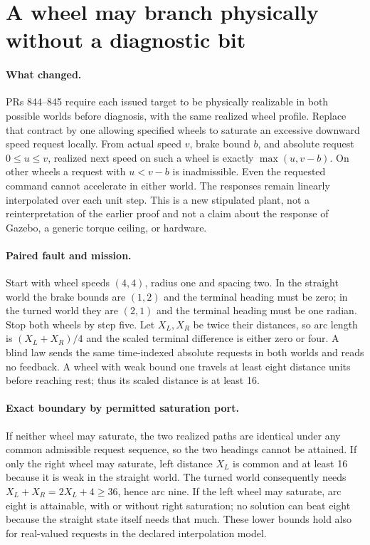 \documentclass{article}
\begin{document}
\section*{A wheel may branch physically without a diagnostic bit}
\paragraph{What changed.}
PRs 844--845 require each issued target to be physically realizable
in both possible worlds before diagnosis, with the same realized
wheel profile. Replace that contract by one allowing specified
wheels to saturate an excessive downward speed request locally.
From actual speed \(v\), brake bound \(b\), and absolute request
\(0\le u\le v\), realized next speed on such a wheel is exactly
\(\max(u,v-b)\). On other wheels a request with \(u<v-b\) is
inadmissible. Even the requested command cannot accelerate in
either world. The responses remain linearly interpolated over
each unit step. This is a new stipulated plant, not a reinterpretation
of the earlier proof and not a claim about the response of Gazebo,
a generic torque ceiling, or hardware.

\paragraph{Paired fault and mission.}
Start with wheel speeds \((4,4)\), radius one and spacing two.
In the straight world the brake bounds are \((1,2)\) and the
terminal heading must be zero; in the turned world they are
\((2,1)\) and the terminal heading must be one radian.
Stop both wheels by step five. Let \(X_L,X_R\) be twice their
distances, so arc length is \((X_L+X_R)/4\) and the scaled terminal
difference is either zero or four. A blind law sends the same
time-indexed absolute requests in both worlds and reads no feedback.
A wheel with weak bound one travels at least eight distance units
before reaching rest; thus its scaled distance is at least 16.

\paragraph{Exact boundary by permitted saturation port.}
If neither wheel may saturate, the two realized paths are identical
under any common admissible request sequence, so the two headings
cannot be attained. If only the right wheel may saturate, left
distance \(X_L\) is common and at least 16 because it is weak in
the straight world. The turned world consequently needs
\(X_L+X_R=2X_L+4\ge36\), hence arc nine.
If the left wheel may saturate, arc eight is attainable, with
or without right saturation; no solution can beat eight because
the straight state itself needs that much. These lower bounds
hold also for real-valued requests in the declared interpolation
model.
\end{document}
